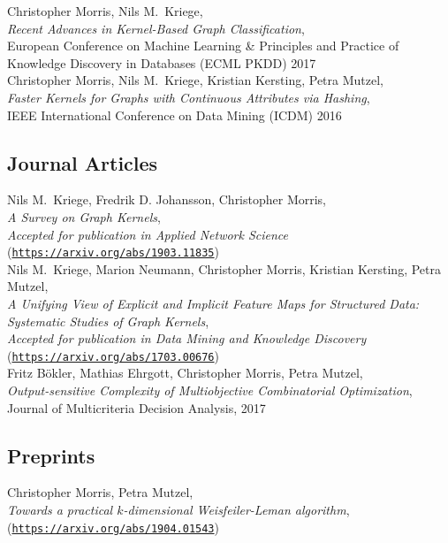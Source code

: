 \documentclass[11pt, a4paper]{scrartcl}
\newcommand{\years}[1]{\marginnote {\textbf{#1}}}
\begin{document}
 Christopher Morris, Nils M.~Kriege,\\
\emph{Recent Advances in Kernel-Based Graph Classification},\\
European Conference on Machine Learning \& Principles and Practice of Knowledge Discovery in Databases (ECML PKDD) 2017\\

\years{2016} Christopher Morris, Nils M.~Kriege, Kristian Kersting, Petra Mutzel,\\
\emph{Faster Kernels for Graphs with Continuous Attributes via Hashing},\\
IEEE International Conference on Data Mining (ICDM) 2016

\subsection*{Journal Articles}


\years{2019}
Nils M.~Kriege,  Fredrik D. Johansson, Christopher Morris,\\
\emph{A Survey on Graph Kernels},\\
\emph{Accepted for publication in \emph{Applied Network Science}}\\
 (\texttt{\url{https://arxiv.org/abs/1903.11835}})\\

Nils M.~Kriege,  Marion Neumann, Christopher Morris, Kristian Kersting, Petra Mutzel,\\
\emph{A Unifying View of Explicit and Implicit Feature Maps for Structured Data: Systematic Studies of Graph Kernels},\\
\emph{Accepted for publication in \emph{Data Mining and Knowledge Discovery}}\\
 (\texttt{\url{https://arxiv.org/abs/1703.00676}})\\

\years{2017} Fritz B\"okler, Mathias Ehrgott, Christopher Morris, Petra Mutzel,\\
\emph{Output-sensitive Complexity of Multiobjective Combinatorial Optimization},\\
Journal of Multicriteria Decision Analysis, 2017\\

\subsection*{Preprints}

\years{2019} Christopher Morris, Petra Mutzel,\\
\emph{Towards a practical $k$-dimensional Weisfeiler-Leman algorithm},\\
(\texttt{\url{https://arxiv.org/abs/1904.01543}})\\
\end{document}
